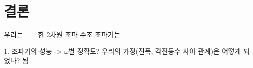 \section{결론}

우리는  ~~~ 한 2차원 조파 수조
조파기는 

1. 조파기의 성능 ->
$\omega$별 정확도?
우리의 가정(진폭, 각진동수 사이 관계)은 어떻게 되었나?
됨